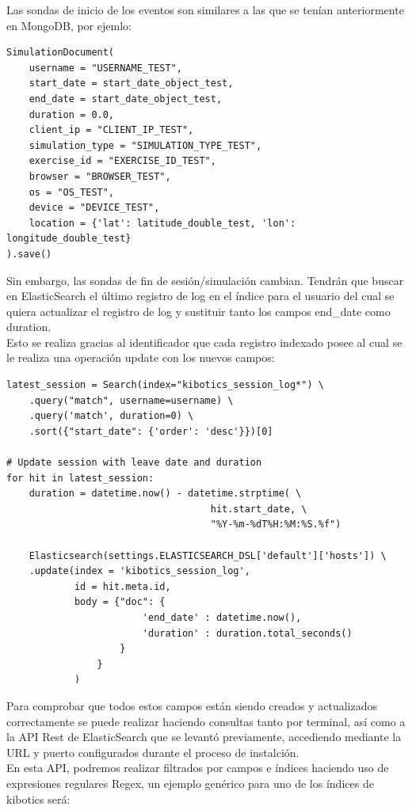 \documentclass[11pt,a4paper]{book}
\begin{document}
				Las sondas de inicio de los eventos son similares a las que se tenían anteriormente en MongoDB, por ejemlo:
				
				\begin{Verbatim}[tabsize=4]
SimulationDocument(
	username = "USERNAME_TEST",
	start_date = start_date_object_test,
	end_date = start_date_object_test,
	duration = 0.0,
	client_ip = "CLIENT_IP_TEST",
	simulation_type = "SIMULATION_TYPE_TEST",
	exercise_id = "EXERCISE_ID_TEST",
	browser = "BROWSER_TEST",
	os = "OS_TEST",
	device = "DEVICE_TEST",
	location = {'lat': latitude_double_test, 'lon': longitude_double_test}
).save()
				\end{Verbatim}

				Sin embargo, las sondas de fin de sesión/simulación cambian. Tendrán que buscar en ElasticSearch el último registro de log en el índice para el usuario del cual se quiera actualizar el registro de log y sustituir tanto los campos end\_date como duration. \\
				Esto se realiza gracias al identificador que cada registro indexado posee al cual se le realiza una operación update con los nuevos campos:
				
				\begin{Verbatim}[tabsize=4]
latest_session = Search(index="kibotics_session_log*") \
	.query("match", username=username) \
	.query('match', duration=0) \
	.sort({"start_date": {'order': 'desc'}})[0]

# Update session with leave date and duration
for hit in latest_session:
	duration = datetime.now() - datetime.strptime( \
									hit.start_date, \
	 								"%Y-%m-%dT%H:%M:%S.%f")
	 
	Elasticsearch(settings.ELASTICSEARCH_DSL['default']['hosts']) \
	.update(index = 'kibotics_session_log', 
			id = hit.meta.id,
			body = {"doc": {
						'end_date' : datetime.now(), 
						'duration' : duration.total_seconds()
					}
				}
			)
				\end{Verbatim}
				
				Para comprobar que todos estos campos están siendo creados y actualizados correctamente se puede realizar haciendo consultas tanto por terminal, así como a la API Rest de ElasticSearch que se levantó previamente, accediendo mediante la URL y puerto configurados durante el proceso de instalción.	\\
				
				En esta API, podremos realizar filtrados por campos e índices haciendo uso de expresiones regulares Regex, un ejemplo genérico para uno de los índices de kibotics será:
				
\end{document}
